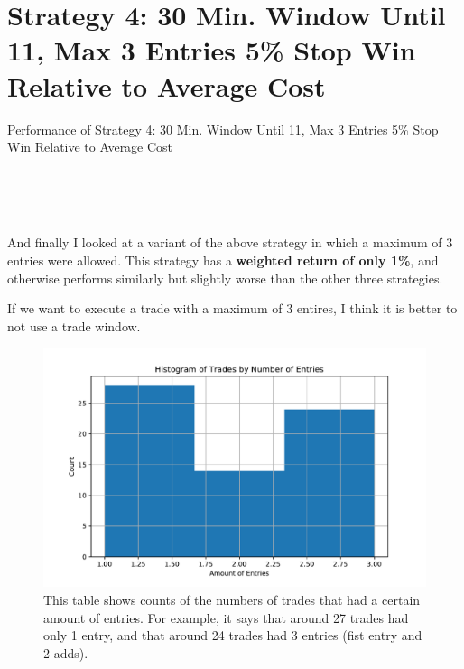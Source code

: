 \documentclass{article}
\begin{document}
\pagebreak

\section{Strategy 4: 30 Min. Window Until 11, Max 3 Entries 5\% Stop Win Relative to Average Cost}


\begin{table}
\caption{Performance of Strategy 4: 30 Min. Window Until 11, Max 3 Entries 5\% Stop Win Relative to Average Cost}
\\[2ex]


\\[2ex]


\\[2ex]

\label{tab_strat_4}
\end{table}

And finally I looked at a variant of the above strategy in which a maximum of 3 entries were allowed. This strategy has a \textbf{weighted return of only 1\%}, and otherwise performs similarly but slightly worse than the other three strategies.

If we want to execute a trade with a maximum of 3 entires, I think it is better to not use a trade window. 

\begin{figure}
	\includegraphics[width=\textwidth]{prog_entry_w30_stop_win_lim3_hist.pdf}
	\caption{This table shows counts of the numbers of trades that had a certain amount of entries. For example, it says that around 27 trades had only 1 entry, and that around 24 trades had 3 entries (fist entry and 2 adds).}
	\label{hist_strat_4}
	\end{figure}
\end{document}
